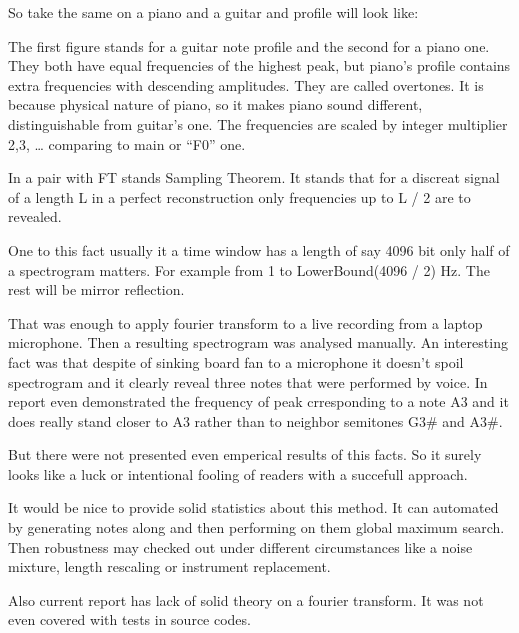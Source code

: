 \documentclass[oneside, final, 14pt]{extarticle}
\begin{document}
So take the same on a piano and a guitar and profile will look like:






The first figure stands for a guitar note profile and the second for a piano
one.  They both have equal frequencies of the highest peak, but piano's profile
contains extra frequencies with descending amplitudes. They are called
overtones. It is because physical nature of piano, so it makes piano sound
different, distinguishable from guitar's one. The frequencies are scaled by
integer multiplier 2,3, … comparing to main or “F0” one.

In a pair with FT stands Sampling Theorem. It stands that for a discreat signal
of a length L in a perfect reconstruction only frequencies up to L / 2 are to
revealed.

One to this fact usually it a time window has a length of say 4096 bit only
half of a spectrogram matters. For example from 1 to LowerBound(4096 / 2) Hz.
The rest will be mirror reflection.

That was enough to apply fourier transform to a live recording from a laptop
microphone. Then a resulting spectrogram was analysed manually. An interesting
fact was that despite of sinking board fan to a microphone it doesn't spoil
spectrogram and it clearly reveal three notes that were performed by voice. In
report even demonstrated the frequency of peak crresponding to a note A3 and it
does really stand closer to A3 rather than to neighbor semitones G3\# and A3\#.

But there were not presented even emperical results of this facts. So it surely
looks like a luck or intentional fooling of readers with a succefull approach.

It would be nice to provide solid statistics about this method. It can
automated by generating notes along and then performing on them global maximum
search. Then robustness may checked out under different circumstances like a
noise mixture, length rescaling or instrument replacement.

Also current report has lack of solid theory on a fourier transform. It was not
even covered with tests in source codes.
\end{document}
